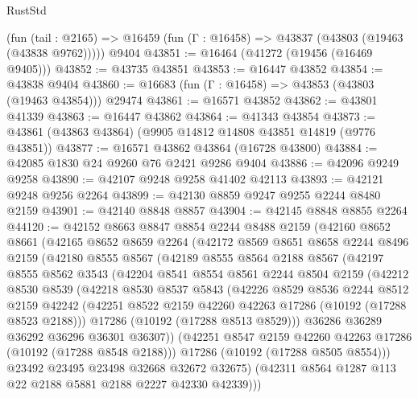 \begin{lexlean}{RustStd}
\begin{coremodule}
    (fun (tail : @2165) => @16459 (fun (Γ : @16458) => @43837 (@43803 (@19463 (@43838 @9762)))))
    @9404
@43851 := @16464 (@41272 (@19456 (@16469 @9405)))
@43852 := @43735 @43851
@43853 := @16447 @43852
@43854 := @43838 @9404
@43860 := @16683 (fun (Γ : @16458) => @43853 (@43803 (@19463 @43854))) @29474
@43861 := @16571 @43852
@43862 := @43801 @41339
@43863 := @16447 @43862
@43864 := @41343 @43854
@43873 := @43861 (@43863 @43864) (@9905 @14812 @14808 @43851 @14819 (@9776 @43851))
@43877 := @16571 @43862 @43864 (@16728 @43800)
@43884 := @42085 @1830 @24 @9260 @76 @2421 @9286 @9404
@43886 := @42096 @9249 @9258
@43890 := @42107 @9248 @9258 @41402 @42113
@43893 := @42121 @9248 @9256 @2264
@43899 := @42130 @8859 @9247 @9255 @2244 @8480 @2159
@43901 := @42140 @8848 @8857
@43904 := @42145 @8848 @8855 @2264
@44120 := @42152
    @8663
    @8847
    @8854
    @2244
    @8488
    @2159
    (@42160
      @8652
      @8661
      (@42165
        @8652
        @8659
        @2264
        (@42172
          @8569
          @8651
          @8658
          @2244
          @8496
          @2159
          (@42180
            @8555
            @8567
            (@42189
              @8555
              @8564
              @2188
              @8567
              (@42197
                @8555
                @8562
                @3543
                (@42204
                  @8541
                  @8554
                  @8561
                  @2244
                  @8504
                  @2159
                  (@42212
                    @8530
                    @8539
                    (@42218
                      @8530
                      @8537
                      @5843
                      (@42226
                        @8529
                        @8536
                        @2244
                        @8512
                        @2159
                        @42242
                        (@42251 @8522 @2159 @42260 @42263 @17286 (@10192 (@17288 @8523 @2188)))
                        @17286
                        (@10192 (@17288 @8513 @8529)))
                      @36286
                      @36289
                      @36292
                      @36296
                      @36301
                      @36307))
                  (@42251 @8547 @2159 @42260 @42263 @17286 (@10192 (@17288 @8548 @2188)))
                  @17286
                  (@10192 (@17288 @8505 @8554)))
                @23492
                @23495
                @23498
                @32668
                @32672
                @32675)
              (@42311 @8564 @1287 @113 @22 @2188 @5881 @2188 @2227 @42330 @42339)))

\end{coremodule}
\end{lexlean}
